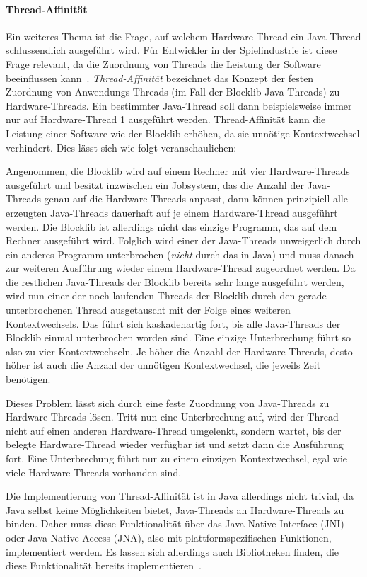 \paragraph{Thread-Affinität}
Ein weiteres Thema ist die Frage, auf welchem Hardware-Thread ein Java-Thread schlussendlich ausgeführt wird. Für Entwickler in der Spielindustrie ist diese Frage relevant, da die Zuordnung von Threads die Leistung der Software beeinflussen kann~\cite{Gyrling2015}. \emph{Thread-Affinität} bezeichnet das Konzept der festen Zuordnung von Anwendungs-Threads (im Fall der Blocklib Java-Threads) zu Hardware-Threads. Ein bestimmter Java-Thread soll dann beispielsweise immer nur auf Hardware-Thread 1 ausgeführt werden. Thread-Affinität kann die Leistung einer Software wie der Blocklib erhöhen, da sie unnötige Kontextwechsel verhindert. Dies lässt sich wie folgt veranschaulichen:

\begin{example}	
Angenommen, die Blocklib wird auf einem Rechner mit vier Hardware-Threads ausgeführt und besitzt inzwischen ein Jobsystem, das die Anzahl der Java-Threads genau auf die Hardware-Threads anpasst, dann können prinzipiell alle erzeugten Java-Threads dauerhaft auf je einem Hardware-Thread ausgeführt werden. Die Blocklib ist allerdings nicht das einzige Programm, das auf dem Rechner ausgeführt wird. Folglich wird einer der Java-Threads unweigerlich durch ein anderes Programm unterbrochen (\emph{nicht} durch das  in Java) und muss danach zur weiteren Ausführung wieder einem Hardware-Thread zugeordnet werden. Da die restlichen Java-Threads der Blocklib bereits sehr lange ausgeführt werden, wird nun einer der noch laufenden Threads der Blocklib durch den gerade unterbrochenen Thread ausgetauscht mit der Folge eines weiteren Kontextwechsels. Das führt sich kaskadenartig fort, bis alle Java-Threads der Blocklib einmal unterbrochen worden sind. Eine einzige Unterbrechung führt so also zu vier Kontextwechseln. Je höher die Anzahl der Hardware-Threads, desto höher ist auch die Anzahl der unnötigen Kontextwechsel, die jeweils Zeit benötigen.

Dieses Problem lässt sich durch eine feste Zuordnung von Java-Threads zu Hardware-Threads lösen. Tritt nun eine Unterbrechung auf, wird der Thread nicht auf einen anderen Hardware-Thread umgelenkt, sondern wartet, bis der belegte Hardware-Thread wieder verfügbar ist und setzt dann die Ausführung fort. Eine Unterbrechung führt nur zu einem einzigen Kontextwechsel, egal wie viele Hardware-Threads vorhanden sind.
\end{example}

Die Implementierung von Thread-Affinität ist in Java allerdings nicht trivial, da Java selbst keine Möglichkeiten bietet, Java-Threads an Hardware-Threads zu binden. Daher muss diese Funktionalität über das Java Native Interface (JNI) oder Java Native Access (JNA), also mit plattformspezifischen Funktionen, implementiert werden. Es lassen sich allerdings auch Bibliotheken finden, die diese Funktionalität bereits implementieren~\cite{ChronicleSoftware,Cheremin2011}.